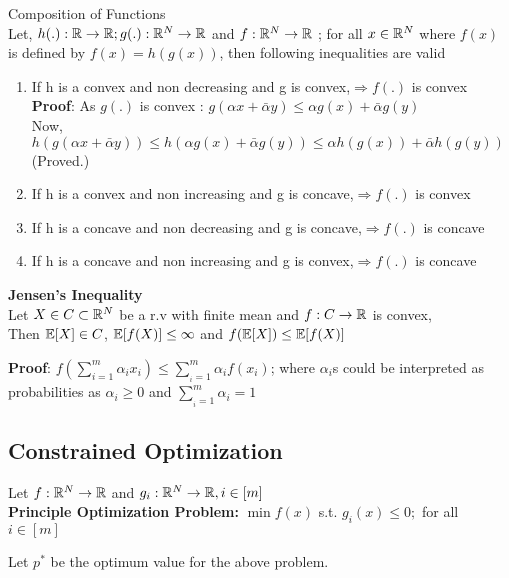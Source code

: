 \documentclass[a4paper,english,12pt]{article}
\begin{document}
{\begin{lem}{Composition of Functions}
	\\Let, $h(.):\mathbb{R}\to\mathbb{R};g(.):\mathbb{R}^N\to\mathbb{R}$ and $f:\mathbb{R}^N\to\mathbb{R}$ ;  for all $ x \in \mathbb{R}^N$ where $f(x)$ is defined by $f(x) = h(g(x))$, then following inequalities are valid
	\begin{enumerate}
		\item If h is a convex and non decreasing and g is convex,$\Longrightarrow f(.)$ is convex\\
		\textbf{Proof}: As $g(.)$ is convex :  $g(\alpha x + \bar{\alpha}y )\leq \alpha g(x) + \bar{\alpha} g(y)$\\		
		Now, $h(g(\alpha x + \bar{\alpha}y ))\leq h(\alpha g(x) + \bar{\alpha} g(y))\leq \alpha h(g(x)) + \bar{\alpha} h(g(y))$(Proved.)
		\item If h is a convex and non increasing and g is concave,$\Longrightarrow f(.)$ is convex
		\item If h is a concave and non decreasing and g is concave,$\Longrightarrow f(.)$ is concave
		\item If h is a concave and non increasing and g is convex,$\Longrightarrow f(.)$ is concave
	\end{enumerate}
	
\end{lem}
\begin{thm}{\textbf{Jensen's Inequality}}
\\Let $X\in C \subset \mathbb{R}^N$ be a r.v with finite mean and $f:C\to \mathbb{R}$ is convex,\\
Then $\mathbb{E}[X] \in C$,   $\mathbb{E}[f(X)]\leq \infty$ and $f(\mathbb{E}[X]) \leq \mathbb{E}[f(X)]$	
\end{thm}

\begin{flushleft}
	\textbf{Proof}: $f(\displaystyle{\sum_{i=1}^{m}\alpha_{i}x_{i}}) \leq \sum_{_i=1}^{m}\alpha_{i}f(x_{i})$; where $\alpha_{i}$s could be interpreted as probabilities as $\alpha_{i}\geq0$ and $\displaystyle{\sum_{_i=1}^{m}\alpha_{i}}=1$
\end{flushleft}
	
\subsection{Constrained Optimization}
Let $f:\mathbb{R}^N\to\mathbb{R}$ and $g_{i}:\mathbb{R}^N\to\mathbb{R}, i \in [m]$ \\
\textbf{Principle Optimization Problem:} $\min f(x)$ s.t. $g_{i}(x)\leq 0;$ for all $ i \in [m]$
\begin{note}
	Let $p^*$ be the optimum value for the above problem.
\end{note}

}
\end{document}

